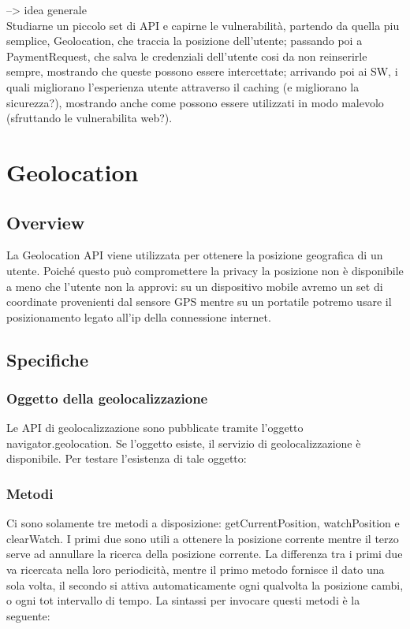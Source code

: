 \documentclass[11pt ,a4paper , twoside , openright ]{article}
\begin{document}
--> idea generale
\\
Studiarne un piccolo set di API e capirne le vulnerabilità, partendo da quella piu semplice, Geolocation, che traccia la posizione dell'utente; passando poi a PaymentRequest, che salva le credenziali dell'utente cosi da non reinserirle sempre, mostrando che queste possono essere intercettate; arrivando poi ai SW, i quali migliorano l'esperienza utente attraverso il caching (e migliorano la sicurezza?), mostrando anche come possono essere utilizzati in modo malevolo (sfruttando le vulnerabilita web?).
\cleardoublepage
\section{Geolocation}
\subsection{Overview}
La Geolocation API viene utilizzata per ottenere la posizione geografica di un utente. 
Poiché questo può compromettere la privacy la posizione non è disponibile a meno che l'utente non la approvi: su un dispositivo mobile avremo un set di coordinate provenienti dal sensore GPS mentre su un portatile potremo usare il posizionamento legato all’ip della connessione internet.

\subsection{Specifiche}

\subsubsection{Oggetto della geolocalizzazione}
Le API di geolocalizzazione sono pubblicate tramite l'oggetto navigator.geolocation. Se l'oggetto esiste, il servizio di geolocalizzazione è disponibile. Per testare l'esistenza di tale oggetto:


\subsubsection{Metodi}
Ci sono solamente tre metodi a disposizione: getCurrentPosition, watchPosition e clearWatch. I primi due sono utili a ottenere la posizione corrente mentre il terzo serve ad annullare la ricerca della posizione corrente. 
La differenza tra i primi due va ricercata nella loro periodicità, mentre il primo metodo fornisce il dato una sola volta, il secondo si attiva automaticamente ogni qualvolta la posizione cambi, o ogni tot intervallo di tempo.
La sintassi per invocare questi metodi è la seguente:

\end{document}
